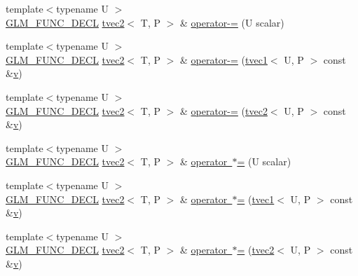 \begin{DoxyCompactItemize}
\item 
{\footnotesize template$<$typename U $>$ }\\\mbox{\hyperlink{setup_8hpp_ab2d052de21a70539923e9bcbf6e83a51}{G\+L\+M\+\_\+\+F\+U\+N\+C\+\_\+\+D\+E\+CL}} \mbox{\hyperlink{structglm_1_1tvec2}{tvec2}}$<$ T, P $>$ \& \mbox{\hyperlink{structglm_1_1tvec2_acc941bd8f14e3b52ce45433ae0ab8898}{operator-\/=}} (U scalar)
\item 
{\footnotesize template$<$typename U $>$ }\\\mbox{\hyperlink{setup_8hpp_ab2d052de21a70539923e9bcbf6e83a51}{G\+L\+M\+\_\+\+F\+U\+N\+C\+\_\+\+D\+E\+CL}} \mbox{\hyperlink{structglm_1_1tvec2}{tvec2}}$<$ T, P $>$ \& \mbox{\hyperlink{structglm_1_1tvec2_ac78b83ac2b1331f1d99f1fa9465c4147}{operator-\/=}} (\mbox{\hyperlink{structglm_1_1tvec1}{tvec1}}$<$ U, P $>$ const \&\mbox{\hyperlink{glad_8h_a14cfbe2fc2234f5504618905b69d1e06}{v}})
\item 
{\footnotesize template$<$typename U $>$ }\\\mbox{\hyperlink{setup_8hpp_ab2d052de21a70539923e9bcbf6e83a51}{G\+L\+M\+\_\+\+F\+U\+N\+C\+\_\+\+D\+E\+CL}} \mbox{\hyperlink{structglm_1_1tvec2}{tvec2}}$<$ T, P $>$ \& \mbox{\hyperlink{structglm_1_1tvec2_a6ad11c3283bc3a6d76f92047e15d3fcc}{operator-\/=}} (\mbox{\hyperlink{structglm_1_1tvec2}{tvec2}}$<$ U, P $>$ const \&\mbox{\hyperlink{glad_8h_a14cfbe2fc2234f5504618905b69d1e06}{v}})
\item 
{\footnotesize template$<$typename U $>$ }\\\mbox{\hyperlink{setup_8hpp_ab2d052de21a70539923e9bcbf6e83a51}{G\+L\+M\+\_\+\+F\+U\+N\+C\+\_\+\+D\+E\+CL}} \mbox{\hyperlink{structglm_1_1tvec2}{tvec2}}$<$ T, P $>$ \& \mbox{\hyperlink{structglm_1_1tvec2_a347a92dd6de7699d3a8fb7fcdb47f21d}{operator $\ast$=}} (U scalar)
\item 
{\footnotesize template$<$typename U $>$ }\\\mbox{\hyperlink{setup_8hpp_ab2d052de21a70539923e9bcbf6e83a51}{G\+L\+M\+\_\+\+F\+U\+N\+C\+\_\+\+D\+E\+CL}} \mbox{\hyperlink{structglm_1_1tvec2}{tvec2}}$<$ T, P $>$ \& \mbox{\hyperlink{structglm_1_1tvec2_ab73ea662db7faeb22dd5ff978ab8073d}{operator $\ast$=}} (\mbox{\hyperlink{structglm_1_1tvec1}{tvec1}}$<$ U, P $>$ const \&\mbox{\hyperlink{glad_8h_a14cfbe2fc2234f5504618905b69d1e06}{v}})
\item 
{\footnotesize template$<$typename U $>$ }\\\mbox{\hyperlink{setup_8hpp_ab2d052de21a70539923e9bcbf6e83a51}{G\+L\+M\+\_\+\+F\+U\+N\+C\+\_\+\+D\+E\+CL}} \mbox{\hyperlink{structglm_1_1tvec2}{tvec2}}$<$ T, P $>$ \& \mbox{\hyperlink{structglm_1_1tvec2_ac201b80d54ac8e55dddb4df2e89871b7}{operator $\ast$=}} (\mbox{\hyperlink{structglm_1_1tvec2}{tvec2}}$<$ U, P $>$ const \&\mbox{\hyperlink{glad_8h_a14cfbe2fc2234f5504618905b69d1e06}{v}})

\end{DoxyCompactItemize}
